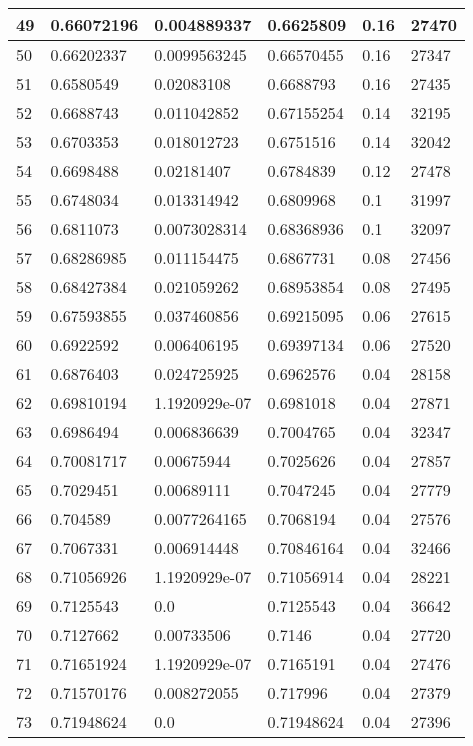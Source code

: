 \begin{longtable}{|l|l|l|l|l|l|}
49 & 0.66072196 & 0.004889337 & 0.6625809 & 0.16 & 27470 \\ \hline 
50 & 0.66202337 & 0.0099563245 & 0.66570455 & 0.16 & 27347 \\ \hline 
51 & 0.6580549 & 0.02083108 & 0.6688793 & 0.16 & 27435 \\ \hline 
52 & 0.6688743 & 0.011042852 & 0.67155254 & 0.14 & 32195 \\ \hline 
53 & 0.6703353 & 0.018012723 & 0.6751516 & 0.14 & 32042 \\ \hline 
54 & 0.6698488 & 0.02181407 & 0.6784839 & 0.12 & 27478 \\ \hline 
55 & 0.6748034 & 0.013314942 & 0.6809968 & 0.1 & 31997 \\ \hline 
56 & 0.6811073 & 0.0073028314 & 0.68368936 & 0.1 & 32097 \\ \hline 
57 & 0.68286985 & 0.011154475 & 0.6867731 & 0.08 & 27456 \\ \hline 
58 & 0.68427384 & 0.021059262 & 0.68953854 & 0.08 & 27495 \\ \hline 
59 & 0.67593855 & 0.037460856 & 0.69215095 & 0.06 & 27615 \\ \hline 
60 & 0.6922592 & 0.006406195 & 0.69397134 & 0.06 & 27520 \\ \hline 
61 & 0.6876403 & 0.024725925 & 0.6962576 & 0.04 & 28158 \\ \hline 
62 & 0.69810194 & 1.1920929e-07 & 0.6981018 & 0.04 & 27871 \\ \hline 
63 & 0.6986494 & 0.006836639 & 0.7004765 & 0.04 & 32347 \\ \hline 
64 & 0.70081717 & 0.00675944 & 0.7025626 & 0.04 & 27857 \\ \hline 
65 & 0.7029451 & 0.00689111 & 0.7047245 & 0.04 & 27779 \\ \hline 
66 & 0.704589 & 0.0077264165 & 0.7068194 & 0.04 & 27576 \\ \hline 
67 & 0.7067331 & 0.006914448 & 0.70846164 & 0.04 & 32466 \\ \hline 
68 & 0.71056926 & 1.1920929e-07 & 0.71056914 & 0.04 & 28221 \\ \hline 
69 & 0.7125543 & 0.0 & 0.7125543 & 0.04 & 36642 \\ \hline 
70 & 0.7127662 & 0.00733506 & 0.7146 & 0.04 & 27720 \\ \hline 
71 & 0.71651924 & 1.1920929e-07 & 0.7165191 & 0.04 & 27476 \\ \hline 
72 & 0.71570176 & 0.008272055 & 0.717996 & 0.04 & 27379 \\ \hline 
73 & 0.71948624 & 0.0 & 0.71948624 & 0.04 & 27396 \\ \hline 

\end{longtable}
